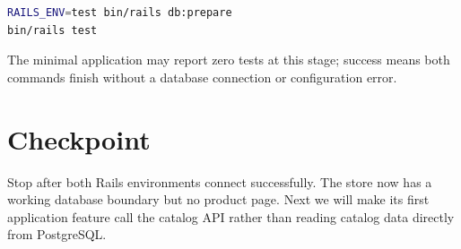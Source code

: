 \begin{lstlisting}[language=sh]
RAILS_ENV=test bin/rails db:prepare
bin/rails test
\end{lstlisting}

The minimal application may report zero tests at this stage; success means
both commands finish without a database connection or configuration error.

\section{Checkpoint}

Stop after both Rails environments connect successfully. The store now has a
working database boundary but no product page. Next we will make its first
application feature call the catalog API rather than reading catalog data
directly from PostgreSQL.
